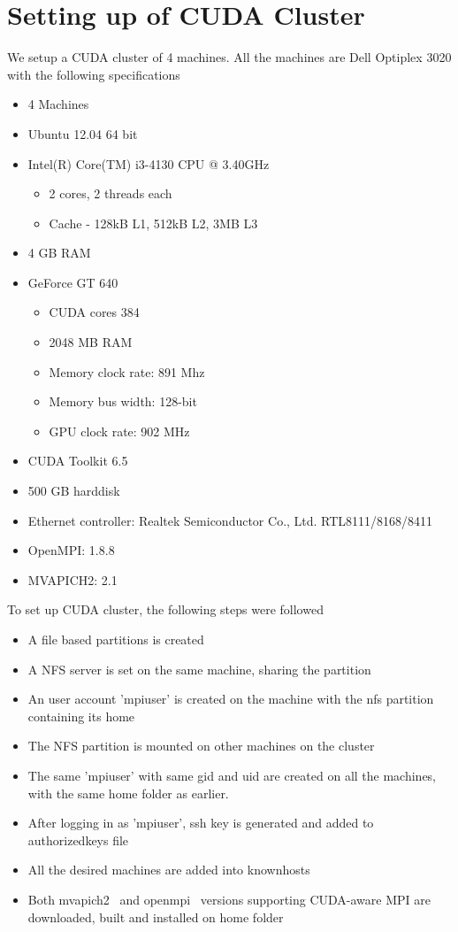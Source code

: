 \documentclass[10pt]{article}
\begin{document}
\section{Setting up of CUDA Cluster}
We setup a CUDA cluster of 4 machines. All the machines are Dell Optiplex 3020 with the following specifications
\begin{itemize}
\item 4 Machines
\item Ubuntu 12.04 64 bit
\item Intel(R) Core(TM) i3-4130 CPU @ 3.40GHz
\begin{itemize}
\item 2 cores, 2 threads each
\item Cache - 128kB L1, 512kB L2,  3MB L3 
\end{itemize}
\item 4 GB RAM
\item GeForce GT 640
\begin{itemize}
\item CUDA cores 384 
\item 2048 MB RAM
\item Memory clock rate: 891 Mhz
\item Memory bus width: 128-bit
\item GPU clock rate: 902 MHz 

\end{itemize}
\item CUDA Toolkit 6.5
\item 500 GB harddisk 
\item Ethernet controller: Realtek Semiconductor Co., Ltd. RTL8111/8168/8411
\item OpenMPI: 1.8.8
\item MVAPICH2: 2.1
\end{itemize}

To set up CUDA cluster, the following steps were followed
\begin{itemize}
\item A file based partitions is created~\cite{filebased}
\item A NFS server is set on the same machine, sharing the partition~\cite{nfssetup}
\item An user account 'mpiuser' is created on the machine with the nfs partition containing its home
\item The NFS partition is mounted on other machines on the cluster
\item The same 'mpiuser' with same gid and uid are created on all the machines, with the same home folder as earlier.
\item After logging in as 'mpiuser', ssh key is generated and added to authorized\textunderscore keys file
\item All the desired machines are added into known\textunderscore hosts 
\item Both mvapich2~\cite{mvapich} and openmpi~\cite{openmpi} versions supporting CUDA-aware MPI are downloaded, built and installed on home folder 
\end{itemize}
\end{document}

